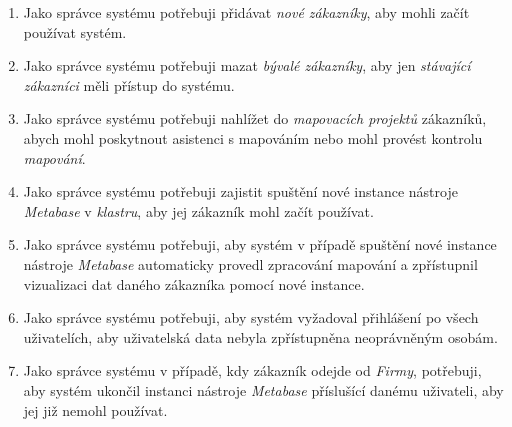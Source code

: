 \begin{enumerate}
    \item Jako správce systému potřebuji přidávat \textit{nové zákazníky}, aby mohli začít používat systém.
    \item Jako správce systému potřebuji mazat \textit{bývalé zákazníky}, aby jen \textit{stávající zákazníci} měli přístup do systému.
    \item Jako správce systému potřebuji nahlížet do \textit{mapovacích projektů} zákazníků, abych mohl poskytnout asistenci s mapováním nebo mohl provést kontrolu \textit{mapování}.
    \item Jako správce systému potřebuji zajistit spuštění nové instance nástroje \textit{Metabase} v \textit{klastru}, aby jej zákazník  mohl začít používat.
    \item Jako správce systému potřebuji, aby systém v případě spuštění nové instance nástroje \textit{Metabase} automaticky provedl zpracování mapování a zpřístupnil vizualizaci dat daného zákazníka pomocí nové instance.
    \item Jako správce systému potřebuji, aby systém vyžadoval přihlášení po všech uživatelích, aby uživatelská data nebyla zpřístupněna neoprávněným osobám.
    \item Jako správce systému v případě, kdy zákazník odejde od \textit{Firmy}, potřebuji, aby systém ukončil instanci nástroje \textit{Metabase} příslušící danému uživateli, aby jej již nemohl používat.
    
\end{enumerate}

